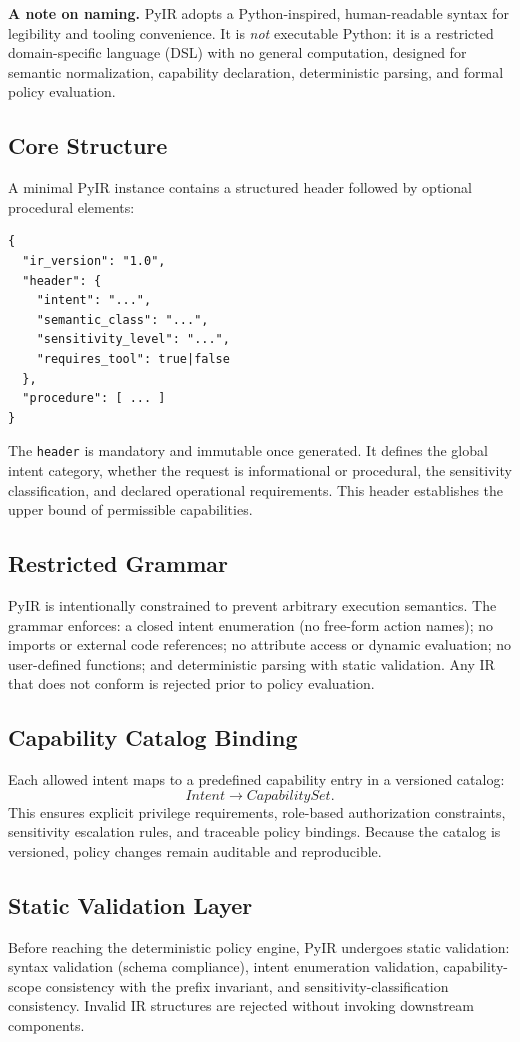 \documentclass[conference]{IEEEtran}
\begin{document}
\noindent\textbf{A note on naming.} PyIR adopts a Python-inspired,
human-readable syntax for legibility and tooling convenience. It is
\emph{not} executable Python: it is a restricted domain-specific language
(DSL) with no general computation, designed for semantic normalization,
capability declaration, deterministic parsing, and formal policy
evaluation.

\subsection{Core Structure}
A minimal PyIR instance contains a structured header followed by optional
procedural elements:
\begin{verbatim}
{
  "ir_version": "1.0",
  "header": {
    "intent": "...",
    "semantic_class": "...",
    "sensitivity_level": "...",
    "requires_tool": true|false
  },
  "procedure": [ ... ]
}
\end{verbatim}
The \texttt{header} is mandatory and immutable once generated. It defines
the global intent category, whether the request is informational or
procedural, the sensitivity classification, and declared operational
requirements. This header establishes the upper bound of permissible
capabilities.

\subsection{Restricted Grammar}
PyIR is intentionally constrained to prevent arbitrary execution
semantics. The grammar enforces: a closed intent enumeration (no free-form
action names); no imports or external code references; no attribute access
or dynamic evaluation; no user-defined functions; and deterministic
parsing with static validation. Any IR that does not conform is rejected
prior to policy evaluation.

\subsection{Capability Catalog Binding}
Each allowed intent maps to a predefined capability entry in a versioned
catalog:
\[
\mathit{Intent} \rightarrow \mathit{CapabilitySet}.
\]
This ensures explicit privilege requirements, role-based authorization
constraints, sensitivity escalation rules, and traceable policy bindings.
Because the catalog is versioned, policy changes remain auditable and
reproducible.

\subsection{Static Validation Layer}
Before reaching the deterministic policy engine, PyIR undergoes static
validation: syntax validation (schema compliance), intent enumeration
validation, capability-scope consistency with the prefix invariant, and
sensitivity-classification consistency. Invalid IR structures are rejected
without invoking downstream components.
\end{document}
